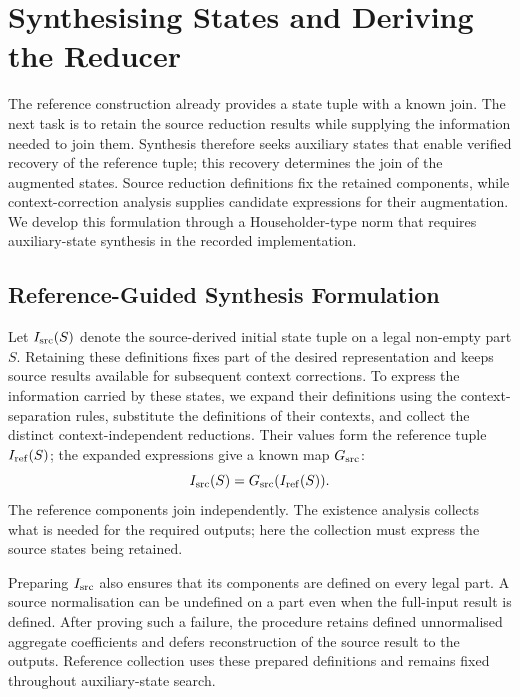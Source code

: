 \section{Synthesising States and Deriving the Reducer}
\label{sec:derivation}

The reference construction already provides a state tuple with a known join.
The next task is to retain the source reduction results while supplying the information needed to join them.
Synthesis therefore seeks auxiliary states that enable verified recovery of the reference tuple; this recovery determines the join of the augmented states.
Source reduction definitions fix the retained components, while context-correction analysis supplies candidate expressions for their augmentation.
We develop this formulation through a Householder-type norm that requires auxiliary-state synthesis in the recorded implementation.

\subsection{Reference-Guided Synthesis Formulation}
\label{sec:selection}

Let $I_{\mathrm{src}}(S)$ denote the source-derived initial state tuple on a legal non-empty part $S$.
Retaining these definitions fixes part of the desired representation and keeps source results available for subsequent context corrections.
To express the information carried by these states, we expand their definitions using the context-separation rules, substitute the definitions of their contexts, and collect the distinct context-independent reductions.
Their values form the reference tuple $I_{\mathrm{ref}}(S)$; the expanded expressions give a known map $G_{\mathrm{src}}$:
\begin{equation}
\label{eq:source-reference}
I_{\mathrm{src}}(S)=G_{\mathrm{src}}(I_{\mathrm{ref}}(S)).
\end{equation}
The reference components join independently.
The existence analysis collects what is needed for the required outputs; here the collection must express the source states being retained.

Preparing $I_{\mathrm{src}}$ also ensures that its components are defined on every legal part.
A source normalisation can be undefined on a part even when the full-input result is defined.
After proving such a failure, the procedure retains defined unnormalised aggregate coefficients and defers reconstruction of the source result to the outputs.
Reference collection uses these prepared definitions and remains fixed throughout auxiliary-state search.

